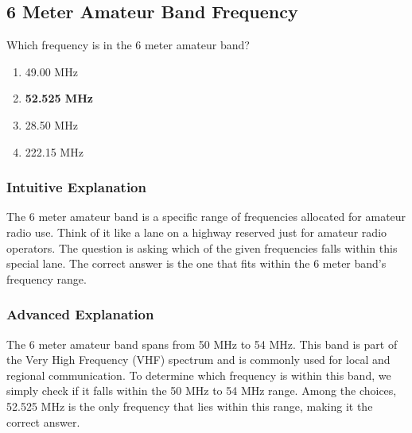 \subsection{6 Meter Amateur Band Frequency}
\label{T1B03}

\begin{tcolorbox}[colback=gray!10!white,colframe=black!75!black,title=T1B03]
Which frequency is in the 6 meter amateur band?
\begin{enumerate}[label=\Alph*),noitemsep]
    \item 49.00 MHz
    \item \textbf{52.525 MHz}
    \item 28.50 MHz
    \item 222.15 MHz
\end{enumerate}
\end{tcolorbox}

\subsubsection*{Intuitive Explanation}
The 6 meter amateur band is a specific range of frequencies allocated for amateur radio use. Think of it like a lane on a highway reserved just for amateur radio operators. The question is asking which of the given frequencies falls within this special lane. The correct answer is the one that fits within the 6 meter band's frequency range.

\subsubsection*{Advanced Explanation}
The 6 meter amateur band spans from 50 MHz to 54 MHz. This band is part of the Very High Frequency (VHF) spectrum and is commonly used for local and regional communication. To determine which frequency is within this band, we simply check if it falls within the 50 MHz to 54 MHz range. Among the choices, 52.525 MHz is the only frequency that lies within this range, making it the correct answer.